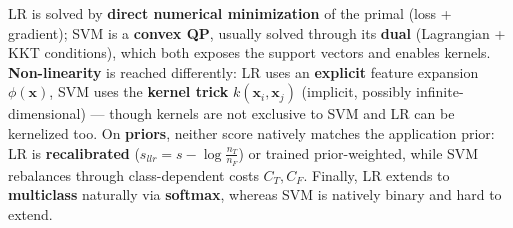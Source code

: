 LR is solved by \textbf{direct numerical minimization} of the primal (loss + gradient); SVM is a \textbf{convex QP}, usually solved through its \textbf{dual} (Lagrangian + KKT conditions), which both exposes the support vectors and enables kernels. \textbf{Non-linearity} is reached differently: LR uses an \textbf{explicit} feature expansion $\phi(\mathbf{x})$, SVM uses the \textbf{kernel trick} $k(\mathbf{x}_i,\mathbf{x}_j)$ (implicit, possibly infinite-dimensional) --- though kernels are not exclusive to SVM and LR can be kernelized too. On \textbf{priors}, neither score natively matches the application prior: LR is \textbf{recalibrated} ($s_{llr}=s-\log\frac{n_T}{n_F}$) or trained prior-weighted, while SVM rebalances through class-dependent costs $C_T,C_F$. Finally, LR extends to \textbf{multiclass} naturally via \textbf{softmax}, whereas SVM is natively binary and hard to extend.

\begin{center}
\renewcommand{\arraystretch}{1.2}
%
\end{center}
